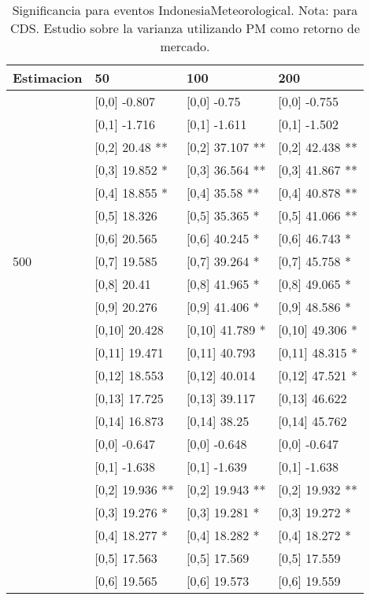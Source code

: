 \begin{table}

\caption{Significancia para eventos IndonesiaMeteorological. Nota: para CDS. Estudio sobre la varianza utilizando PM como retorno de mercado.}
\centering
\begin{tabular}[t]{llll}
\toprule
Estimacion & 50 & 100 & 200\\
\midrule
 & {}[0,0] -0.807 & {}[0,0] -0.75 & {}[0,0] -0.755\\
 & {}[0,1] -1.716 & {}[0,1] -1.611 & {}[0,1] -1.502\\
 & {}[0,2] 20.48 ** & {}[0,2] 37.107 ** & {}[0,2] 42.438 **\\
 & {}[0,3] 19.852 * & {}[0,3] 36.564 ** & {}[0,3] 41.867 **\\
 & {}[0,4] 18.855 * & {}[0,4] 35.58 ** & {}[0,4] 40.878 **\\
\addlinespace
 & {}[0,5] 18.326 & {}[0,5] 35.365 * & {}[0,5] 41.066 **\\
 & {}[0,6] 20.565 & {}[0,6] 40.245 * & {}[0,6] 46.743 *\\
500 & {}[0,7] 19.585 & {}[0,7] 39.264 * & {}[0,7] 45.758 *\\
 & {}[0,8] 20.41 & {}[0,8] 41.965 * & {}[0,8] 49.065 *\\
 & {}[0,9] 20.276 & {}[0,9] 41.406 * & {}[0,9] 48.586 *\\
\addlinespace
 & {}[0,10] 20.428 & {}[0,10] 41.789 * & {}[0,10] 49.306 *\\
 & {}[0,11] 19.471 & {}[0,11] 40.793 & {}[0,11] 48.315 *\\
 & {}[0,12] 18.553 & {}[0,12] 40.014 & {}[0,12] 47.521 *\\
 & {}[0,13] 17.725 & {}[0,13] 39.117 & {}[0,13] 46.622\\
 & {}[0,14] 16.873 & {}[0,14] 38.25 & {}[0,14] 45.762\\
\addlinespace
 & {}[0,0] -0.647 & {}[0,0] -0.648 & {}[0,0] -0.647\\
 & {}[0,1] -1.638 & {}[0,1] -1.639 & {}[0,1] -1.638\\
 & {}[0,2] 19.936 ** & {}[0,2] 19.943 ** & {}[0,2] 19.932 **\\
 & {}[0,3] 19.276 * & {}[0,3] 19.281 * & {}[0,3] 19.272 *\\
 & {}[0,4] 18.277 * & {}[0,4] 18.282 * & {}[0,4] 18.272 *\\
\addlinespace
 & {}[0,5] 17.563 & {}[0,5] 17.569 & {}[0,5] 17.559\\
 & {}[0,6] 19.565 & {}[0,6] 19.573 & {}[0,6] 19.559\\

\end{tabular}
\end{table}

